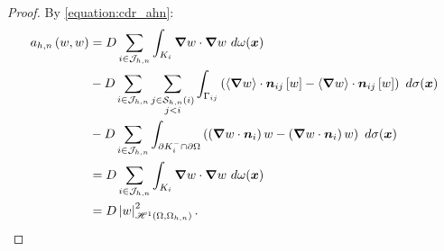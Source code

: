 \begin{proof}
    By \cref{equation:cdr_ahn}:
    \begin{align*}
        a_{h, n} \left( w, w \right) &= D \sum_{i \in \mathcal{J}_{h, n}} \int_{K_i} \bm{\nabla} w \cdot \bm{\nabla} w ~ d \omega(\bm{x}) \\
        &- D \sum_{i \in \mathcal{J}_{h, n}} \sum_{\substack{j \in \mathcal{S}_{h, n}(i) \\ j < i}} \int_{\Gamma_{ij}} \left( \left\langle \bm{\nabla} w \right\rangle \cdot \bm{n}_{ij} \left[ w \right] - \left\langle \bm{\nabla} w \right\rangle \cdot \bm{n}_{ij} \left[ w \right] \right) ~ d \sigma(\bm{x}) \\
        &- D \sum_{i \in \mathcal{J}_{h, n}} \int_{\partial K_i^- \cap \partial \Omega} \left( \left( \bm{\nabla} w \cdot \bm{n}_i \right) w - \left( \bm{\nabla} w \cdot \bm{n}_i \right) w \right) ~ d \sigma(\bm{x}) \\
        &= D \sum_{i \in \mathcal{J}_{h, n}} \int_{K_i} \bm{\nabla} w \cdot \bm{\nabla} w ~ d \omega(\bm{x}) \\
        &= D \left\lvert w \right\rvert_{\mathscr{H}^{1}(\Omega, \Omega_{h, n})}^2.
    \end{align*}


\end{proof}
